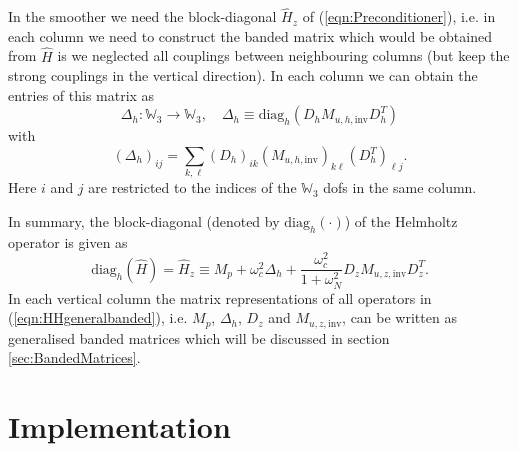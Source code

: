 \documentclass[10pt]{article}
\newcommand{\Wspace}{\mathbb{W}}
\begin{document}
In the smoother we need the block-diagonal $\hat{H}_z$ of (\ref{eqn:Preconditioner}), i.e. in each column we need to construct the banded matrix which would be obtained from $\hat{H}$ is we neglected all couplings between neighbouring columns (but keep the strong couplings in the vertical direction). In each column we can obtain the entries of this matrix as
\begin{equation}
  \Delta_h:\Wspace_3 \rightarrow\Wspace_3,\quad \Delta_h \equiv \text{diag}_{h}\left(D_h M_{u,h,\text{inv}} D_h^T\right)
\end{equation}
with
\begin{equation}
  \left(\Delta_h\right)_{ij}
  = \sum_{k,\ell} 
\left(D_h\right)_{ik} 
\left(M_{u,h,\text{inv}}\right)_{k\ell}
\left(D^T_h\right)_{\ell j}.\label{eqn:Deltah}
\end{equation}
Here $i$ and $j$ are restricted to the indices of the $\Wspace_3$ dofs in the same column.

In summary, the block-diagonal (denoted by $\text{diag}_h(\cdot)$) of the Helmholtz operator is given as
\begin{equation}
  \text{diag}_h(\hat{H}) = \hat{H}_z \equiv M_{p} + \omega_c^2\Delta_h+\frac{\omega_c^2}{1+\omega_N^2} D_z M_{u,z,\text{inv}} D_z^T
  \label{eqn:HHgeneralbanded}.
\end{equation}
In each vertical column the matrix representations of all operators in (\ref{eqn:HHgeneralbanded}), i.e. $M_p$, $\Delta_h$, $D_z$ and $M_{u,z,\text{inv}}$, can be written as generalised banded matrices which will be discussed in section \ref{sec:BandedMatrices}.
\section{Implementation}
\end{document}
